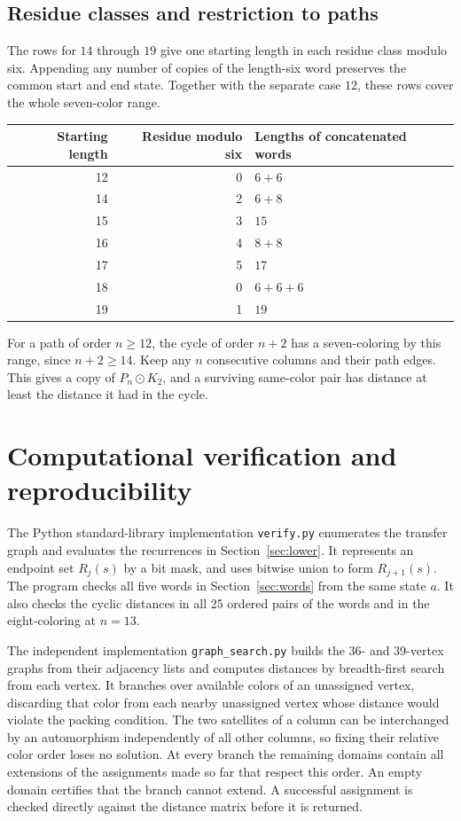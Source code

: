 \documentclass[11pt]{article}
\begin{document}
\subsection{Residue classes and restriction to paths}
The rows for \(14\) through \(19\) give one starting length in each
residue class modulo six. Appending any number of copies of the
length-six word preserves the common start and end state. Together
with the separate case \(12\), these rows cover the whole
seven-color range.

\begin{center}
\begin{tabular}{@{}rrl@{}}
\toprule
Starting length & Residue modulo six & Lengths of concatenated words\\
\midrule
12 & 0 & \(6+6\)\\
14 & 2 & \(6+8\)\\
15 & 3 & \(15\)\\
16 & 4 & \(8+8\)\\
17 & 5 & \(17\)\\
18 & 0 & \(6+6+6\)\\
19 & 1 & \(19\)\\
\bottomrule
\end{tabular}
\end{center}

For a path of order \(n\ge12\), the cycle of order \(n+2\) has a
seven-coloring by this range, since \(n+2\ge14\). Keep any \(n\)
consecutive columns and their path edges. This gives a copy of
\(P_n\odot K_2\), and a surviving same-color pair has distance at least
the distance it had in the cycle.

\section{Computational verification and reproducibility}
\label{sec:reproduce}
The Python standard-library implementation \texttt{verify.py}
enumerates the transfer graph and evaluates the recurrences in
Section~\ref{sec:lower}. It represents an endpoint set \(R_j(s)\) by a bit
mask, and uses bitwise union to form \(R_{j+1}(s)\).
The program checks all five words in Section~\ref{sec:words} from
the same state \(a\). It also checks the cyclic distances in all
25 ordered pairs of the words and in the eight-coloring at \(n=13\).

The independent implementation \texttt{graph\_search.py} builds the
36- and 39-vertex graphs from their adjacency lists and computes
distances by breadth-first search from each vertex. It branches over
available colors of an unassigned vertex, discarding that color from
each nearby unassigned vertex whose distance would violate the packing
condition. The two satellites of a column can be interchanged by an
automorphism independently of all other columns, so fixing their
relative color order loses no solution. At every branch the remaining
domains contain all extensions of the assignments made so far that
respect this order. An empty domain certifies that the branch cannot
extend. A successful assignment is checked directly against the
distance matrix before it is returned.
\end{document}
